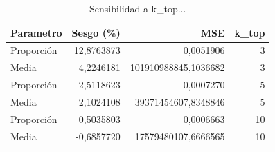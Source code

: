 \begin{table}

\caption{Sensibilidad a k_top...}
\centering
\begin{tabular}[t]{lrrr}
\toprule
Parametro & Sesgo (\%) & MSE & k\_top\\
\midrule
Proporción & 12,8763873 & 0,0051906 & 3\\
Media & 4,2246181 & 101910988845,1036682 & 3\\
Proporción & 2,5118623 & 0,0007270 & 5\\
Media & 2,1024108 & 39371454607,8348846 & 5\\
Proporción & 0,5035803 & 0,0006663 & 10\\
\addlinespace
Media & -0,6857720 & 17579480107,6666565 & 10\\
\bottomrule
\end{tabular}
\end{table}

